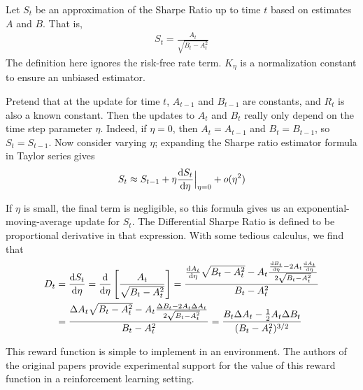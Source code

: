 Let $S_t$ be an approximation of the Sharpe Ratio up to time $t$ based on estimates $A$ and $B$. That is,
\begin{align*}
  S_t = \frac{A_t}{\sqrt{B_t - A_t^2}}
\end{align*}
The definition here ignores the risk-free rate term. $K_\eta$ is a normalization constant to ensure an unbiased estimator.

Pretend that at the update for time $t$, $A_{t-1}$ and $B_{t-1}$ are constants,
and $R_t$ is also a known constant. Then the updates to $A_t$ and $B_t$ really only depend on the time step parameter $\eta$.
Indeed, if $\eta = 0$, then $A_t = A_{t-1}$ and $B_t = B_{t-1}$, so $S_t = S_{t-1}$.
Now consider varying $\eta$; expanding the Sharpe ratio estimator formula in Taylor series gives
\begin{align*}
  S_t \approx S_{t-1} + \eta \frac{\mathop{}\!\mathrm{d} S_t}{\mathop{}\!\mathrm{d} \eta}\Big|_{\eta = 0} + o(\eta^2)
\end{align*}

If $\eta$ is small, the final term is negligible, so this formula gives us an exponential-moving-average update for $S_t$.
The Differential Sharpe Ratio is defined to be proportional derivative in that expression. With some tedious calculus, we find that
\begin{align*}
  D_t &= \frac{\diff S_t}{\diff \eta} = \frac{\diff}{\diff\eta}\left[ \frac{A_t}{\sqrt{B_t - A_t^2}} \right] = \frac{\frac{\diff A_t}{\diff \eta} \sqrt{B_t - A_t^2} - A_t \frac{\frac{\diff B_t}{\diff \eta} - 2 A_t \frac{\diff A_t}{\diff \eta}}{2 \sqrt{B_t - A_t^2}}}{B_t - A_t^2} \\
  &= \frac{\Delta A_t \sqrt{B_t - A_t^2} - A_t \frac{\Delta B_t - 2 A_t \Delta A_t}{2 \sqrt{B_t - A_t^2}}}{B_t - A_t^2}
  = \frac{B_t \Delta A_t - \frac{1}{2} A_t \Delta B_t}{(B_t - A_t^2)^{3/2}}
\end{align*}

This reward function is simple to implement in an environment. The authors of the original papers provide
experimental support for the value of this reward function in a reinforcement learning setting.

